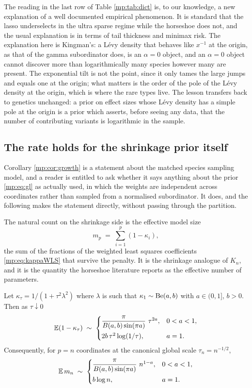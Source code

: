 The reading in the last row of Table \ref{mp:tab:dict} is, to our knowledge, a new explanation of a well documented
empirical phenomenon. It is standard that the lasso underselects in the ultra sparse regime
while the horseshoe does not, and the usual explanation is in terms of tail thickness and
minimax risk. The explanation here is Kingman's: a L\'evy density that behaves like $x^{-1}$ at the origin, as that of the gamma subordinator does, is an $\alpha=0$ object, and an $\alpha=0$ object cannot discover more than logarithmically many species however many are present. The exponential tilt is not the point, since it only tames the large jumps and equals one at the origin; what matters is the order of the pole of the L\'evy density at the origin, which is where the rare types live. The lesson transfers back to genetics unchanged: a prior on effect sizes whose L\'evy density has a simple pole at the origin is a prior which asserts, before seeing any
data, that the number of contributing variants is logarithmic in the sample.

\subsection{The rate holds for the shrinkage prior itself}
\label{mp:sec:direct}

Corollary \ref{mp:cor:growth} is a statement about the matched species sampling model, and a
reader is entitled to ask whether it says anything about the prior \eqref{mp:eq:gl} as actually
used, in which the weights are independent across coordinates rather than sampled from a
normalised subordinator. It does, and the following makes the statement directly, without
passing through the partition.

The natural count on the shrinkage side is the effective model size
\begin{equation}
m_p \;=\; \sum_{i=1}^{p}(1-\kappa_i),
\label{mp:eq:effsize}
\end{equation}
the sum of the fractions of the weighted least squares coefficients \eqref{mp:eq:kappaWLS} that
survive the penalty. It is the shrinkage analogue of $K_n$, and it is the quantity the
horseshoe literature reports as the effective number of parameters.

\begin{theorem}
\label{mp:thm:effsize}
Let $\kappa_\tau=1/(1+\tau^2\lambda^2)$ where $\lambda$ is such that $\kappa_1\sim\mathrm{Be}(a,b)$
with $a\in(0,1]$, $b>0$. Then as $\tau\downarrow0$
\[
\mathbb{E}(1-\kappa_\tau)\;\sim\;
\begin{cases}
\dfrac{\pi}{B(a,b)\sin(\pi a)}\ \tau^{2a}, & 0<a<1,\\[8pt]
2b\,\tau^{2}\log(1/\tau), & a=1 .
\end{cases}
\]
Consequently, for $p=n$ coordinates at the canonical global scale $\tau_n=n^{-1/2}$,
\[
\mathbb{E}\,m_n \;\sim\;
\begin{cases}
\dfrac{\pi}{B(a,b)\sin(\pi a)}\ n^{1-a}, & 0<a<1,\\[8pt]
b\log n, & a=1 .
\end{cases}
\]
\end{theorem}

